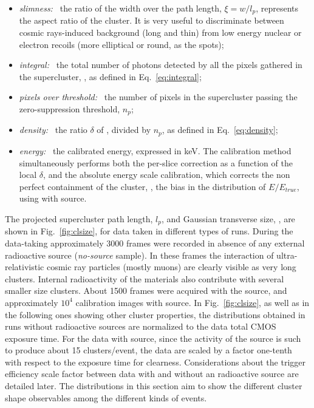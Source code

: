 \begin{itemize}
  \item \textit{slimness:~} the ratio of the width over the path
    length, $\xi=w/l_p$, represents the aspect ratio of the
    cluster. It is very useful to discriminate between cosmic
    rays-induced background (long and thin) from low energy nuclear or
    electron recoils (more elliptical or round, as the \fe spots);
    
  \item \textit{integral:~} the total number of photons detected by all the
  pixels gathered in the supercluster, \isclu, as defined in
  Eq.~\ref{eq:integral};

  \item \textit{pixels over threshold:~} the number of pixels in the
  supercluster passing the zero-suppression threshold, $n_p$;

  \item \textit{density:~} the ratio $\delta$ of \isclu, divided by
  $n_p$, as defined in Eq.~\ref{eq:density};

  \item \textit{energy:~} the calibrated energy, expressed in keV. The
    calibration method simultaneously performs both the per-slice
    correction as a function of the local $\delta$, and the absolute
    energy scale calibration, which corrects the non perfect
    containment of the cluster, \ie, the bias in the distribution of
    $E/E_{true}$, using with \fe source.
\end{itemize}

The projected supercluster path length, $l_p$, and Gaussian transverse
size, \tsigmag, are shown in Fig.~\ref{fig:clsize}, for data taken in
different types of runs.  During the data-taking approximately 3000
frames were recorded in absence of any external radioactive source
({\it no-source} sample). In these frames the interaction of
ultra-relativistic cosmic ray particles (mostly muons) are clearly
visible as very long clusters. Internal radioactivity of the \lemon
materials also contribute with several smaller size clusters. About
1500 frames were acquired with the \ambe source, and approximately
$10^4$ calibration images with \fe source. In Fig.~\ref{fig:clsize},
as well as in the following ones showing other cluster properties, the
distributions obtained in runs without radioactive sources are
normalized to the \ambe data total CMOS exposure time. For the data
with \fe source, since the activity of the source is such to produce
about 15 clusters/event, the data are scaled by a factor one-tenth
with respect to the \ambe exposure time for clearness. Considerations
about the trigger efficiency scale factor between data with and
without an radioactive source are detailed later. The distributions in
this section aim to show the different cluster shape observables among
the different kinds of events.

